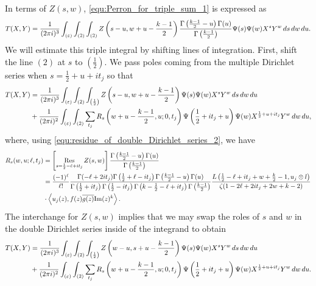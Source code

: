 \documentclass[12pt,reqno,oneside]{amsart}
\begin{document}
  In terms of $Z(s,w)$, \cref{equ:Perron_for_triple_sum_1} is expressed as
  \begin{equation}\label{equ:Perron_for_triple_sum_2}
    T(X,Y) = \frac{1}{(2\pi i)^{3}}\int_{(\varepsilon)}\int_{(2)}\int_{(2)}Z\left(s-u,w+u-\frac{k-1}{2}\right)\frac{\Gamma\left(\frac{k-1}{2}-u\right)\Gamma(u)}{\Gamma\left(\frac{k-1}{2}\right)}\Psi(s)\Psi(w)X^{s}Y^{w}\,ds\,dw\,du.
  \end{equation}
  We will estimate this triple integral by shifting lines of integration. First, shift the line $(2)$ at $s$ to $\left(\frac{1}{2}\right)$. We pass poles coming from the multiple Dirichlet series when $s = \frac{1}{2}+u+it_{j}$ so that
  \begin{align*}
    T(X,Y) &= \frac{1}{(2\pi i)^{3}}\int_{(\varepsilon)}\int_{(2)}\int_{\left(\frac{1}{2}\right)}Z\left(s-u,w+u-\frac{k-1}{2}\right)\Psi(s)\Psi(w)X^{s}Y^{w}\,ds\,dw\,du \\
    &+ \frac{1}{(2\pi i)^{2}}\int_{(\varepsilon)}\int_{(2)}\sum_{t_{j}}R_{s}\left(w+u-\frac{k-1}{2},u;0,t_{j}\right)\Psi\left(\frac{1}{2}+it_{j}+u\right)\Psi(w)X^{\frac{1}{2}+u+it_{j}}Y^{w}\,dw\,du,
  \end{align*}
  where, using \cref{equ:residue_of_double_Dirichlet_series_2}, we have
  \begin{align*}
    R_{s}(w,u;\ell,t_{j}) &= \left[\operatorname*{\mathrm{Res}}_{s = \frac{1}{2}-\ell+it_{j}}Z(s,w)\right]\frac{\Gamma\left(\frac{k-1}{2}-u\right)\Gamma(u)}{\Gamma\left(\frac{k-1}{2}\right)} \\
    &= \frac{(-1)^{\ell}}{\ell!}\frac{\Gamma(-\ell+2it_{j})\Gamma\left(\frac{1}{2}+\ell-it_{j}\right)\Gamma\left(\frac{k-1}{2}-u\right)\Gamma(u)}{\Gamma\left(\frac{1}{2}+it_{j}\right)\Gamma\left(\frac{1}{2}-it_{j}\right)\Gamma\left(k-\frac{1}{2}-\ell+it_{j}\right)\Gamma\left(\frac{k-1}{2}\right)}\frac{L\left(\frac{1}{2}-\ell+it_{j}+w+\frac{k}{2}-1,u_{j} \otimes l\right)}{\zeta(1-2\ell+2it_{j}+2w+k-2)} \\
      &\cdot \left\langle u_{j}(z),f(z)\overline{g(z)}\mathrm{Im}(z)^{k}\right\rangle.
  \end{align*}
  The interchange for $Z(s,w)$ implies that we may swap the roles of $s$ and $w$ in the double Dirichlet series inside of the integrand to obtain
  \begin{align*}
    T(X,Y) &= \frac{1}{(2\pi i)^{3}}\int_{(\varepsilon)}\int_{(2)}\int_{\left(\frac{1}{2}\right)}Z\left(w-u,s+u-\frac{k-1}{2}\right)\Psi(s)\Psi(w)X^{s}Y^{w}\,ds\,dw\,du \\
    &+ \frac{1}{(2\pi i)^{2}}\int_{(\varepsilon)}\int_{(2)}\sum_{t_{j}}R_{s}\left(w+u-\frac{k-1}{2},u;0,t_{j}\right)\Psi\left(\frac{1}{2}+it_{j}+u\right)\Psi(w)X^{\frac{1}{2}+u+it_{j}}Y^{w}\,dw\,du.
  \end{align*}
\end{document}
